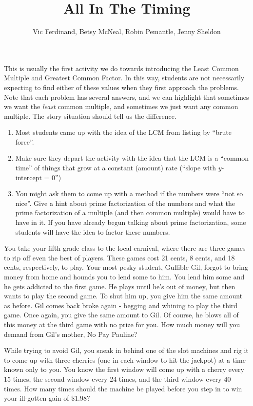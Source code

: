 \documentclass{ximera}
\title{All In The Timing}
\author{Vic Ferdinand, Betsy McNeal, Robin Pemantle, Jenny Sheldon}
\begin{document}
\begin{abstract} \end{abstract}
\maketitle

\begin{instructorIntro}
This is usually the first activity we do towards introducing the Least Common Multiple and Greatest Common Factor.  In this way, students are not necessarily expecting to find either of these values when they first approach the problems.  Note that each problem has several answers, and we can highlight that sometimes we want the {\em least} common multiple, and sometimes we just want any common multiple.  The story situation should tell us the difference.

\begin{enumerate}
	\item Most students came up with the idea of the LCM from listing by ``brute force''.
	\item Make sure they depart the activity with the idea that the LCM is a ``common time'' of things that grow at a constant (amount) rate (``slope with $y$-intercept = 0'')
	\item You might ask them to come up with a method if the numbers were ``not so nice''.  Give a hint about prime factorization of the numbers and what the prime factorization of a multiple (and then common multiple) would have to have in it.  If you have already begun talking about prime factorization, some students will have the idea to factor these numbers.
\end{enumerate}
\end{instructorIntro}


\begin{problem}
 You take your fifth grade class to the local carnival, where there are three games to rip off even the best of players.  These games cost 21 cents, 8 cents, and 18 cents, respectively, to play.  Your most pesky student, Gullible Gil, forgot to bring money from home and hounds you to lend some to him.  You lend him some and he gets addicted to the first game.  He plays until he's out of money, but then wants to play the second game.  To shut him up, you give him the same amount as before.  Gil comes back broke again - begging and whining to play the third game.  Once again, you give the same amount to Gil.  Of course, he blows all of this money at the third game with no prize for you.  How much money will you demand from Gil's mother, No Pay Pauline?
\end{problem}

\begin{problem}
 While trying to avoid Gil, you sneak in behind one of the slot machines and rig it to come up with three cherries (one in each window to hit the jackpot) at a time known only to you. You know the first window will come up with a cherry every 15 times, the second window every 24 times, and the third window every 40 times.  How many times should the machine be played before you step in to win your ill-gotten gain of $\$$1.98?

\end{problem}
\end{document}
